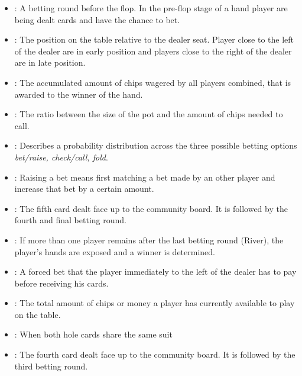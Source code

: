 \begin{appendices}
\begin{itemize}
\item {}:
A betting round before the flop. In the pre-flop stage of a hand player are being dealt cards and have the chance to bet.
\item {}:
The position on the table relative to the dealer seat. Player close to the left of the dealer are in early position and players close to the right of the dealer are in late position.
\item {}:
The accumulated amount of chips wagered by all players combined, that is awarded to the winner of the hand.
\item {}:
The ratio between the size of the pot and the amount of chips needed to call.
\item {}:
Describes a probability distribution across the three possible betting options \textit{bet/raise, check/call, fold}.
\item {}:
Raising a bet means first matching a bet made by an other player and increase that bet by a certain amount.
\item {}: The fifth card dealt face up to the community board. It is followed by the fourth and final betting round.
\item {}:
If more than one player remains after the last betting round (River), the player's hands are exposed and a winner is determined.
\item {}:
A forced bet that the player immediately to the left of the dealer has to pay before receiving his cards.
\item {}:
The total amount of chips or money a player has currently available to play on the table.
\item {}:
When both hole cards share the same suit
\item {}: The fourth card dealt face up to the community board. It  is followed by the third betting round. 
\end{itemize}
\end{appendices}



